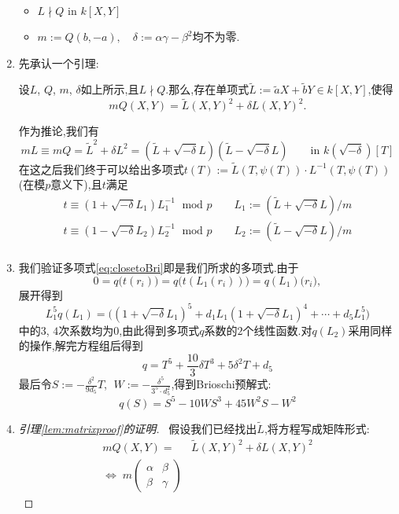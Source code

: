\begin{enumerate}[Step 1.]
\begin{itemize}
		\item $L \nmid Q \text{ in }k[X,Y]$ 
		\item $m:=Q(b,-a), \quad \delta:=\alpha\gamma-\beta^2$均不为零.
	\end{itemize}
	\item 先承认一个引理:
	\begin{lemma}\label{lem:matrixproof}
		设$L$, $Q$, $m$, $\delta$如上所示,且$L \nmid Q$.那么,存在单项式$\tilde{L}:=\tilde{a}X+\tilde{b}Y \in k[X,Y]$,使得
		\begin{equation}\label{eq:matrixproof}
		mQ(X,Y)=\tilde{L}(X,Y)^2+\delta L(X,Y)^2.
		\end{equation}
	\end{lemma}
	作为推论,我们有
	$$mL \equiv mQ =\tilde{L}^2 +\delta L^2=(\tilde{L}+\sqrt{-\delta}L)(\tilde{L}-\sqrt{-\delta}L) 	\qquad \text{in }k(\sqrt{-\delta})[T]$$
	在这之后我们终于可以给出多项式$t(T):=\tilde{L}(T,\psi(T)) \cdot L^{-1}(T,\psi(T))$(在模$p$意义下),且$t$满足
	\begin{equation*}
	\begin{aligned}
	t\equiv (1+\sqrt{-\delta}L_1)L_1^{-1} \; \text{ mod }p \qquad L_1:=(\tilde{L}+\sqrt{-\delta}L)/m\\
	t\equiv (1-\sqrt{-\delta}L_2)L_2^{-1} \; \text{ mod }p \qquad L_2:=(\tilde{L}-\sqrt{-\delta}L)/m\\
	\end{aligned}
	\end{equation*}
	\item 我们验证多项式\eqref{eq:closetoBri}即是我们所求的多项式.由于
	$$0=q\big(t(r_i)\big)=q\big(t(L_1(r_i))\big)=q(L_1)\big(r_i\big),$$
	展开得到
	$$L_1^5q(L_1)= \Big((1+\sqrt{-\delta}L_1)^5+d_1 L_1 (1+\sqrt{-\delta}L_1)^4 + \cdots + d_5 L_1^5\Big)$$
	中的$3$, $4$次系数均为$0$,由此得到多项式$q$系数的$2$个线性函数.对$q(L_2)$采用同样的操作,解完方程组后得到
	$$q=T^5+\frac{10}{3}\delta T^3+5\delta^2T+d_5$$
	最后令$\displaystyle S:=-\frac{\delta^2}{9d_5}T$, $\;\displaystyle W:=-\frac{\delta^5}{3^5 \cdot d_5^2}$,得到Brioschi预解式:
	$$q(S)=S^5-10WS^3+45W^2S-W^2$$
	\item \begin{proof}[引理\ref{lem:matrixproof}的证明]\
		假设我们已经找出$\tilde{L}$,将方程写成矩阵形式:
		\begin{equation*}
		\begin{aligned}
		mQ(X,Y)=&\tilde{L}(X,Y)^2+\delta L(X,Y)^2\\
		\Longleftrightarrow\; m\begin{pmatrix}
		\alpha & \beta \\ \beta & \gamma

\end{pmatrix}
\end{aligned}
\end{equation*}
\end{proof}
\end{enumerate}
